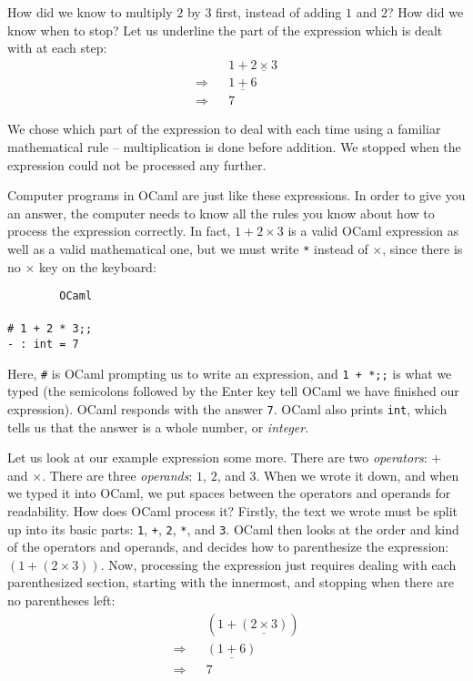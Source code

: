 \documentclass[]{book}
\newcommand{\smspace}{\vspace{4mm}}
\begin{document}
\noindent How did we know to multiply $2$ by $3$ first, instead of adding $1$ and $2$?
How did we know when to stop? Let us underline the part of the expression which is dealt with at each step:
\begin{eqnarray*}
 & & 1 + \underline{2 \times 3} \\
 \Longrightarrow & & \underline{1 + 6} \\
 \Longrightarrow & & 7
\end{eqnarray*}

\noindent We chose which part of the expression to deal with each time using a familiar
mathematical rule -- multiplication is done before addition. We stopped when the
expression could not be processed any further.

Computer programs in OCaml are just like these expressions. In order to give
you an answer, the computer needs to know all the rules you know about how to
process the expression correctly.  In fact, $1 + 2 \times 3$ is a valid OCaml
expression as well as a valid mathematical one, but we must write \verb!*! instead
of $\times$, since there is no $\times$ key on the keyboard: 

\smspace
\noindent\verb!        OCaml!\\
\noindent\\
\noindent\verb!# 1 + 2 * 3;;!\\
\noindent\verb!- : int = 7!
\smspace

\noindent Here, \verb!#! is OCaml prompting us to write an expression, and
\texttt{1\! +\! *;;} is what we typed (the semicolons followed by the Enter
key tell OCaml we have finished our expression). OCaml responds with the answer
\verb!7!. OCaml also prints \verb!int!, which tells us that the answer is a
whole number, or \textit{integer}.

Let us look at our example expression some more. There are two \textit{operators}: $+$ and $\times$. There are three \textit{operands}: $1$,
$2$, and $3$.  When we wrote it down,
and when we typed it into OCaml, we put spaces between the operators and
operands for readability. How does OCaml process it? Firstly, the text we wrote must be split up into its
basic parts: \verb!1!, \verb!+!, \verb!2!, \verb!*!, and \verb!3!. OCaml then
looks at the order and kind of the operators and operands, and decides how to
parenthesize the expression: $(1 + (2 \times 3))$. Now, processing the expression
just requires dealing with each parenthesized section, starting with the innermost, and stopping when there are no parentheses left:
\begin{eqnarray*}
 & & (1 + \underline{(2 \times 3)}) \\
 \Longrightarrow & & \underline{(1 + 6)} \\
 \Longrightarrow & & 7
\end{eqnarray*}
\end{document}
